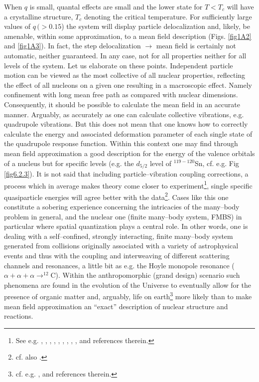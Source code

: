  
  When $q$ is small, quantal effects are small and the lower state for $T<T_c$ will have a crystalline structure, $T_c$ denoting the critical temperature.  For sufficiently large values of $q\, (>0.15$) the system will display particle delocalization and,  likely, be  amenable, within some approximation, to a mean field description (Figs. \ref{fig1A2} and   \ref{fig1A3}). In fact, the step delocalization $\rightarrow$ mean field is certainly not automatic, neither guaranteed. In any case, not for all properties neither for all levels of the system. Let us elaborate on these points. Independent particle motion can be viewed as the most collective of all nuclear properties, reflecting the effect of all nucleons on a given one resulting in a macroscopic effect. Namely confinement with long mean free path as compared with nuclear dimensions. Consequently, it should be possible to calculate the mean field in an accurate manner. Arguably, as accurately as one can calculate collective vibrations, e.g. quadrupole vibrations. But this does not mean that one knows how to correctly calculate the energy and associated deformation parameter of each single state of the quadrupole response function. Within this context one may find through mean field approximation a good description for the energy of the valence orbitals of a nucleus but for  specific levels (e.g. the $d_{5/2}$ level of $^{119-120}$Sn, cf. e.g. Fig \ref{fig6.2.3}). It is not said that  including  particle--vibration coupling corrections, a process which in average makes theory come closer to experiment\footnote{See e.g. \cite{Bohr:75}, \cite{Bortignon:77}, \cite{Mahaux:85}, \cite{Bes:71}, \cite{Bes:71b}, \cite{Bes:71c}, \cite{Bortignon:76}, \cite{Bes:88}, \cite{Barranco:87b}, \cite{Barranco:01} and references therein.}, single specific quasiparticle energies will agree better with the data\footnote{cf. also \cite{Tarpanov:14}.}. Cases like this one constitute a sobering experience concerning the intricacies of the many--body problem in general, and the nuclear one (finite many--body system, FMBS) in particular where spatial quantization plays a central role. In other words, one is dealing with a self--confined, strongly interacting, finite many--body system generated from collisions originally associated  with a variety of astrophysical events and thus with  the coupling and interweaving of different scattering channels and resonances, a little bit as e.g. the Hoyle monopole resonance ($\alpha+\alpha+\alpha\rightarrow^{12}$C). Within the anthropomorphic (grand design) scenario such phenomena are found in the evolution of the Universe to eventually allow for the presence of organic matter and, arguably, life on earth\footnote{cf. e.g. \cite{Rees:00}, \cite{Meissner:14} and references therein.} more likely than to make mean field approximation an ``exact'' description of nuclear structure and reactions.
 
